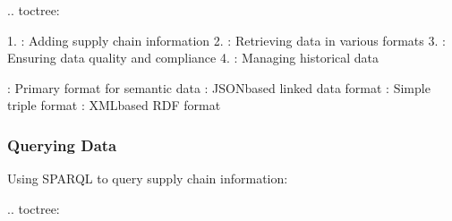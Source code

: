 \documentclass[letterpaper,10pt,english]{sphinxmanual}
\begin{document}
\sphinxAtStartPar
{}
.. toctree:

\begin{sphinxVerbatim}[commandchars=\\\{\}]
 
  

\end{sphinxVerbatim}

\sphinxAtStartPar
{}
1. : Adding supply chain information
2. : Retrieving data in various formats
3. : Ensuring data quality and compliance
4. : Managing historical data

\sphinxAtStartPar
{}
\sphinxhyphen{} : Primary format for semantic data
\sphinxhyphen{} : JSON\sphinxhyphen{}based linked data format
\sphinxhyphen{} : Simple triple format
\sphinxhyphen{} : XML\sphinxhyphen{}based RDF format


\subsubsection{Querying Data}
\label{\detokenize{user-guide/index:querying-data}}
\sphinxAtStartPar
Using SPARQL to query supply chain information:

\sphinxAtStartPar
{}
.. toctree:

\begin{sphinxVerbatim}[commandchars=\\\{\}]
 
  

\end{sphinxVerbatim}
\end{document}
